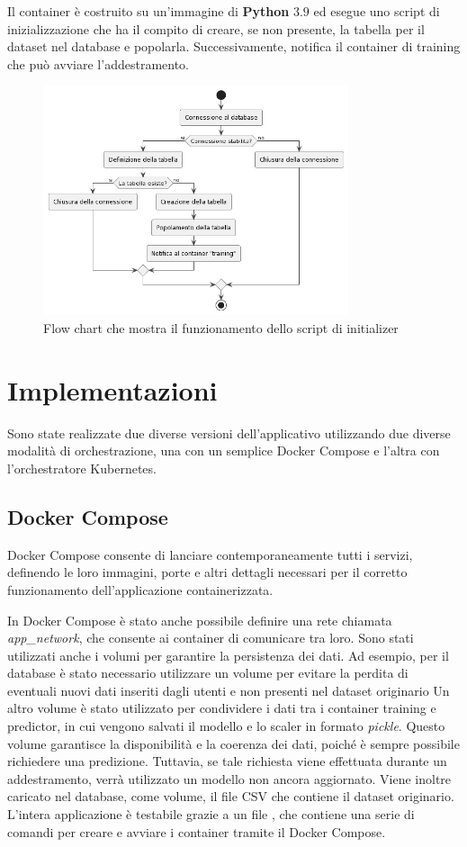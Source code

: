 \documentclass[12pt,a4paper]{report}
\begin{document}
Il container è costruito su un'immagine di \textbf{Python} $3.9$
ed esegue uno script di inizializzazione che ha il compito di creare,
se non presente, la tabella per il dataset nel database e popolarla.
Successivamente, notifica il container di training che può avviare
l'addestramento.
\begin{figure}[H]
  \includegraphics[width=0.8\textwidth]{initializer}
  \centering
  \caption{Flow chart che mostra il funzionamento dello
  script di initializer}
\end{figure}

\chapter{Implementazioni}

Sono state realizzate due diverse versioni dell'applicativo
utilizzando due diverse modalità di orchestrazione,
una con un semplice Docker Compose e l'altra
con l'orchestratore Kubernetes.

\section{Docker Compose}

Docker Compose consente di lanciare contemporaneamente tutti i servizi,
definendo le loro immagini, porte e altri dettagli necessari per il
corretto funzionamento dell'applicazione containerizzata.

In Docker Compose è stato anche possibile definire una rete chiamata
\emph{app\_network}, che consente ai container di comunicare tra loro.
Sono stati utilizzati anche i volumi per garantire la persistenza dei dati.
Ad esempio, per il database è stato necessario utilizzare un volume
per evitare la perdita di eventuali nuovi dati inseriti
dagli utenti e non presenti nel dataset originario
Un altro volume è stato utilizzato per condividere i dati tra
i container training e predictor, in cui vengono salvati il modello
e lo scaler in formato \emph{pickle}. Questo volume garantisce
la disponibilità e la coerenza dei dati, poiché è sempre possibile
richiedere una predizione.
Tuttavia, se tale richiesta viene effettuata durante un addestramento,
verrà utilizzato un modello non ancora aggiornato.
Viene inoltre caricato nel database, come volume, il file CSV
che contiene il dataset originario.
L'intera applicazione è testabile grazie a un file ,
che contiene una serie di comandi per creare e avviare i
container tramite il Docker Compose.
\end{document}
